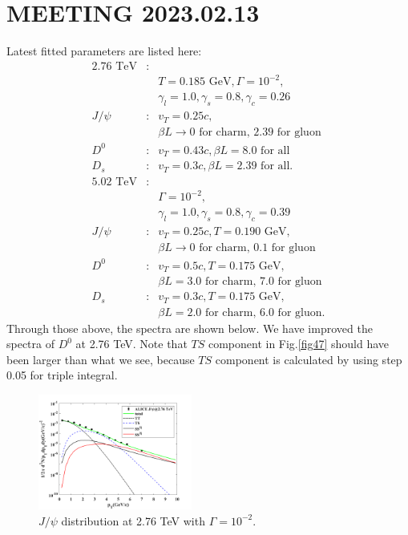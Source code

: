 \documentclass[twocolumn,aps,superscriptaddress,nofootinbib,floatfix]{revtex4}
\begin{document}
\section{MEETING 2023.02.13}
Latest fitted parameters are listed here:
\begin{eqnarray}
	\text{2.76 TeV}&:&  \nonumber \\
	&&T=0.185 \text{ GeV}, \Gamma=10^{-2}, \nonumber \\
	&&\gamma_l=1.0,  \gamma_s=0.8 ,\gamma_c=0.26\nonumber \\
	J/\psi&:& v_T=0.25c,  \\ \nonumber
	&&\beta L\rightarrow \text{0 for charm, 2.39 for gluon}\nonumber\\
	D^0&:& v_T=0.43c,  \beta L=\text{8.0 for all}\nonumber\\
	D_s&:& v_T=0.3c,    \beta L=\text{2.39 for all}.\nonumber\\
	\text{5.02 TeV}&:&  \nonumber \\
	&&\Gamma=10^{-2}, \nonumber \\
	&&\gamma_l=1.0,  \gamma_s=0.8 ,\gamma_c=0.39\nonumber \\
	J/\psi&:& v_T=0.25c,  T=0.190 \text{ GeV},\\ \nonumber
	&&\beta L\rightarrow \text{0 for charm, 0.1 for gluon}\nonumber\\
	D^0&:& v_T=0.5c,  T=0.175 \text{ GeV},\\ \nonumber
	&&\beta L=\text{3.0 for charm, 7.0 for gluon}\nonumber\\
	D_s&:& v_T=0.3c,   T=0.175 \text{ GeV},\\ \nonumber
	&&\beta L=\text{2.0 for charm, 6.0 for gluon}.\nonumber
\end{eqnarray}
Through those above, the spectra are shown below. We have improved the spectra of $D^0$ at 2.76 TeV. Note that $TS$ component in Fig.\ref{fig47} should have been larger than what we see, because $TS$ component is calculated by using step 0.05 for triple integral.
\begin{figure}[H]
	\includegraphics[width=0.45\textwidth]{Jpsi276_230205.png}
	\caption{$J/\psi$ distribution at 2.76 TeV with $\Gamma=10^{-2}$. }
	\label{fig46}
\end{figure}
\end{document}
